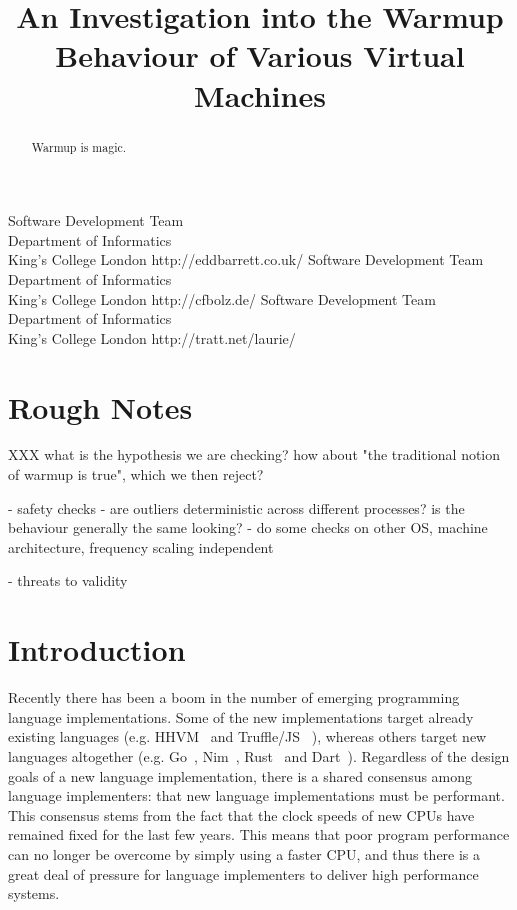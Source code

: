 \documentclass[10pt,preprint]{sigplanconf}
\begin{document}
\title{An Investigation into the Warmup Behaviour of Various Virtual Machines}
           {Software Development Team\\ Department of Informatics\\ King's College London}
           {http://eddbarrett.co.uk/}
           {Software Development Team\\ Department of Informatics\\ King's College London}
           {http://cfbolz.de/}
           {Software Development Team\\ Department of Informatics\\ King's College London}
           {http://tratt.net/laurie/}

\maketitle


\begin{abstract}
Warmup is magic.
\end{abstract}

\section{Rough Notes}

XXX what is the hypothesis we are checking? how about "the traditional notion
of warmup is true", which we then reject?


- safety checks
  - are outliers deterministic across different processes? is the behaviour
    generally the same looking?
  - do some checks on other OS, machine architecture, frequency scaling independent

- threats to validity

\section{Introduction}
\label{sec:intro}

Recently there has been a boom in the number of emerging programming language
implementations. Some of the new implementations target already existing
languages (e.g. HHVM~\cite{XXX} and Truffle/JS ~\cite{XXX}), whereas others
target new languages altogether (e.g. Go~\cite{XXX}, Nim~\cite{XXX},
Rust~\cite{XXX} and Dart~\cite{XXX}). Regardless of the design goals of a new
language implementation, there is a shared consensus among language
implementers: that new language implementations must be performant.  This
consensus stems from the fact that the clock speeds of new CPUs have remained
fixed for the last few years. This means that poor program performance can no
longer be overcome by simply using a faster CPU, and thus there is a great deal
of pressure for language implementers to deliver high performance systems.
\end{document}

